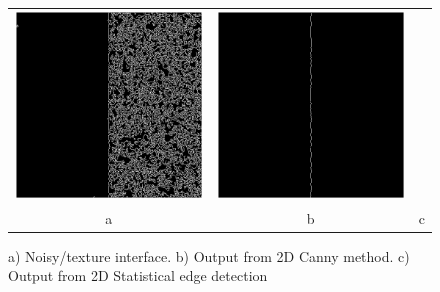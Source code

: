 \documentclass[9pt]{beamer}
\begin{document}
\begin{frame}
\begin{figure}
\begin{tabular}{c c c}
					\includegraphics[scale=0.2]{cannyfail1} &
	
					\includegraphics[scale=0.2]{ks2d}\\
	
					a & b & c
			

			\end{tabular}			
		
					\caption{a) Noisy/texture interface. b) Output from 2D Canny method. c) Output from 2D Statistical edge detection }

		\end{figure}	

\end{frame}
\end{document}
